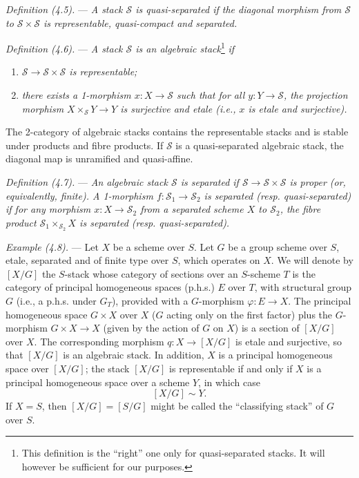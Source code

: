 \documentclass[10pt]{article}
\begin{document}
\medskip
\noindent\emph{Definition (4.5).} --- \emph{A stack $\mathscr S$ is quasi-separated if the diagonal morphism from $\mathscr S$ to $\mathscr S\times\mathscr S$ is representable, quasi-compact and separated.}

\medskip
\noindent\emph{Definition (4.6).} --- \emph{A stack $\mathscr S$ is an algebraic stack}\footnote{This definition is the ``right'' one only for quasi-separated stacks. It will however be sufficient for our purposes.}\emph{ if}
\begin{enumerate}[label=(\roman*)]
\item \emph{$\mathscr S\to\mathscr S\times\mathscr S$ is representable;}
\item \emph{there exists a 1-morphism $x:X\to\mathscr S$ such that for all $y:Y\to\mathscr S$, the projection morphism $X\times_{\mathscr S}Y\to Y$ is surjective and etale (i.e., $x$ is etale and surjective).}
\end{enumerate}

The 2-category of algebraic stacks contains the representable stacks and is stable under products and fibre products. If $\mathscr S$ is a quasi-separated algebraic stack, the diagonal map is unramified and quasi-affine.

\medskip
\noindent\emph{Definition (4.7).} --- \emph{An algebraic stack $\mathscr S$ is separated if $\mathscr S\to\mathscr S\times\mathscr S$ is proper (or, equivalently, finite). A 1-morphism $f:\mathscr S_1\to\mathscr S_2$ is separated (resp. quasi-separated) if for any morphism $x:X\to\mathscr S_2$ from a separated scheme $X$ to $\mathscr S_2$, the fibre product $\mathscr S_1\times_{\mathscr S_2}X$ is separated (resp. quasi-separated).}

\medskip
\noindent\emph{Example (4.8).} --- Let $X$ be a scheme over $S$. Let $G$ be a group scheme over $S$, etale, separated and of finite type over $S$, which operates on $X$. We will denote by $[X/G]$ the $S$-stack whose category of sections over an $S$-scheme $T$ is the category of principal homogeneous spaces (p.h.s.) $E$ over $T$, with structural group $G$ (i.e., a p.h.s. under $G_T$), provided with a $G$-morphism $\varphi:E\to X$. The principal homogeneous space $G\times X$ over $X$ ($G$ acting only on the first factor) plus the $G$-morphism $G\times X\to X$ (given by the action of $G$ on $X$) is a section of $[X/G]$ over $X$. The corresponding morphism $q:X\to[X/G]$ is etale and surjective, so that $[X/G]$ is an algebraic stack. In addition, $X$ is a principal homogeneous space over $[X/G]$; the stack $[X/G]$ is representable if and only if $X$ is a principal homogeneous space over a scheme $Y$, in which case
\[
[X/G]\sim Y.
\]
If $X=S$, then $[X/G]=[S/G]$ might be called the ``classifying stack'' of $G$ over $S$.
\end{document}
